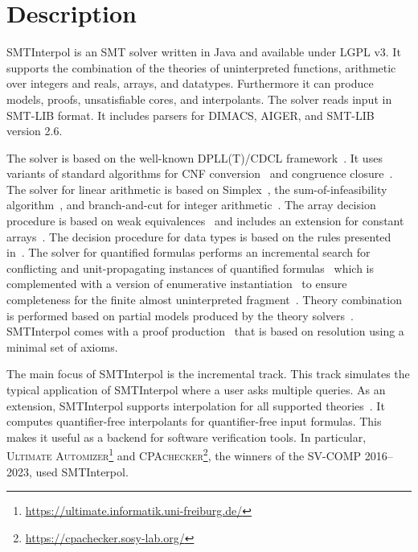 \documentclass[a4paper]{easychair}
\title{\SI\\{\large Version \version}}
\author{Max Barth\inst{1} \and Jochen Hoenicke\inst{2} \and Tanja Schindler\inst{3}}
\institute{
  Ludwig Maximilian University of Munich, \email{max.barth@lmu.de} \and
  Certora, \email{jochen@certora.com} \and
  University of Basel, \email{tanja.schindler@unibas.ch}
}
\newcommand\SI{SMTInterpol\xspace}
\begin{document}
\maketitle
\section*{Description}
\SI is an SMT solver written in Java and available under LGPL v3.
It supports the combination of the theories of uninterpreted functions, arithmetic over integers and reals, arrays, and datatypes.
Furthermore it can produce models, proofs, unsatisfiable cores, and interpolants.
The solver reads input in SMT-LIB format.
It includes parsers for DIMACS, AIGER, and SMT-LIB version 2.6.

The solver is based on the well-known DPLL(T)/CDCL framework~\cite{DBLP:conf/cav/GanzingerHNOT04}.
It uses variants of standard algorithms for CNF conversion~\cite{DBLP:journals/jsc/PlaistedG86} and congruence closure~\cite{DBLP:conf/rta/NieuwenhuisO05}.
The solver for linear arithmetic is based on Simplex~\cite{DBLP:conf/cav/DutertreM06}, the sum-of-infeasibility algorithm~\cite{DBLP:conf/fmcad/KingBD13}, and branch-and-cut for integer arithmetic~\cite{DBLP:conf/cav/ChristH15,DBLP:conf/cav/DilligDA09}.
The array decision procedure is based on weak equivalences~\cite{DBLP:conf/frocos/ChristH15} and includes an extension for constant arrays~\cite{DBLP:conf/vmcai/HoenickeS19}.
The decision procedure for data types is based on the rules presented in~\cite{DBLP:journals/jsat/BarrettST07}.
The solver for quantified formulas performs an incremental search for conflicting and unit-propagating instances of quantified formulas~\cite{DBLP:conf/vmcai/HoenickeS21} which is complemented with a version of enumerative instantiation~\cite{DBLP:conf/tacas/ReynoldsBF18} to ensure completeness for the finite almost uninterpreted fragment~\cite{DBLP:conf/cav/GeM09}.
Theory combination is performed based on partial models produced by the theory solvers~\cite{DBLP:journals/entcs/MouraB08}.
\SI comes with a proof production~\cite{DBLP:conf/smt/HoenickeS22} that is based on resolution using a minimal set of axioms.

The main focus of \SI is the incremental track.
This track simulates the typical application of \SI where a user asks multiple queries.
As an extension, \SI supports interpolation for all supported theories~\cite{DBLP:journals/jar/ChristH16,DBLP:conf/cade/HoenickeS18,DBLP:conf/vmcai/HoenickeS19,DBLP:conf/smt/HenkelHS21}.  It computes quantifier-free interpolants for quantifier-free input formulas.
This makes it useful as a backend for software verification tools.
In particular, \textsc{Ultimate Automizer}\footnote{\url{https://ultimate.informatik.uni-freiburg.de/}} and \textsc{CPAchecker}\footnote{\url{https://cpachecker.sosy-lab.org/}}, the winners of the SV-COMP 2016--2023, used \SI.
\end{document}
